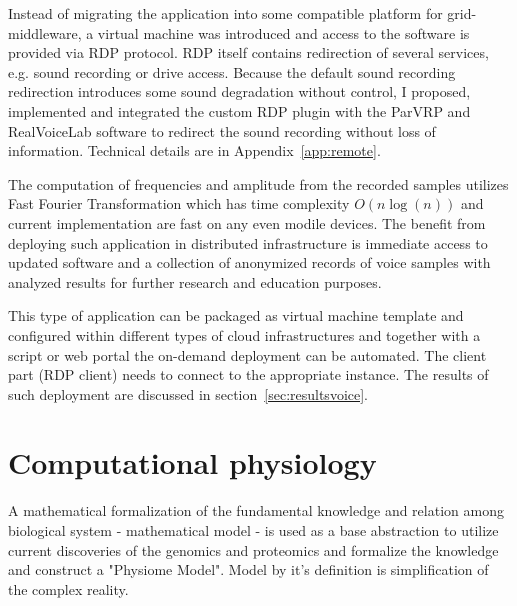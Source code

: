Instead of migrating the application into some compatible platform for grid-middleware, a virtual machine was introduced and access to the software is provided via RDP protocol. RDP itself contains redirection of several services, e.g. sound recording or drive access. Because the default sound recording redirection introduces some sound degradation without control, I proposed, implemented and integrated the custom RDP plugin with the ParVRP and RealVoiceLab software to redirect the sound recording without loss of information. Technical details are in Appendix~\ref{app:remote}. 

The computation of frequencies and amplitude from the recorded samples utilizes Fast Fourier Transformation which has time complexity $O(n\log(n))$ and current implementation are fast on any even modile devices. The benefit from deploying such application in distributed infrastructure is immediate access to updated software and a collection of anonymized records of voice samples with analyzed results for further research and education purposes.

This type of application can be packaged as virtual machine template and configured within different types of cloud infrastructures and together with a script or web portal the on-demand deployment can be automated. The client part (RDP client) needs to connect to the appropriate instance. The results of such deployment are discussed in section~\ref{sec:resultsvoice}.

\section{Computational physiology}
\label{sec:models}
A mathematical formalization of the fundamental knowledge and relation among biological system - mathematical model - is used as a base abstraction to utilize current discoveries of the genomics and proteomics and formalize the knowledge and construct a "Physiome Model". Model by it's definition is simplification of the complex reality.

